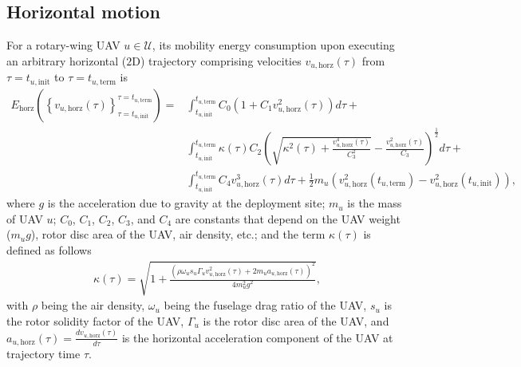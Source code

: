 \documentclass{article}
\begin{document}
\subsection{Horizontal motion}
For a rotary-wing UAV $u{\in}\mathcal{U}$, its mobility energy consumption upon executing an arbitrary horizontal ($2$D) trajectory comprising velocities $v_{u,\mathrm{horz}}(\tau)$ from $\tau{=}t_{u,\mathrm{init}}$ to $\tau{=}t_{u,\mathrm{term}}$ is
\begin{align}\label{Horizontal_energy}
    E_{\mathrm{horz}}\left(\left\{v_{u,\mathrm{horz}}(\tau)\right\}_{\tau{=}t_{u,\mathrm{init}}}^{\tau{=}t_{u,\mathrm{term}}}\right){=}&\int_{t_{u,\mathrm{init}}}^{t_{u,\mathrm{term}}}C_{0}\left(1{+}C_{1}v_{u,\mathrm{horz}}^{2}(\tau)\right)d\tau{+}\\&\int_{t_{u,\mathrm{init}}}^{t_{u,\mathrm{term}}}\kappa(\tau)C_{2}\left(\sqrt{\kappa^{2}(\tau){+}\frac{v_{u,\mathrm{horz}}^{4}(\tau)}{C_{3}^{2}}}{-}\frac{v_{u,\mathrm{horz}}^{2}(\tau)}{C_{3}}\right)^{\frac{1}{2}}d\tau{+}\nonumber\\&\int_{t_{u,\mathrm{init}}}^{t_{u,\mathrm{term}}}C_{4}v_{u,\mathrm{horz}}^{3}(\tau)d\tau{+}\frac{1}{2}m_{u}\left(v_{u,\mathrm{horz}}^{2}(t_{u,\mathrm{term}}){-}v_{u,\mathrm{horz}}^{2}(t_{u,\mathrm{init}})\right),\nonumber
\end{align}
where $g$ is the acceleration due to gravity at the deployment site; $m_{u}$ is the mass of UAV $u$; $C_{0}$, $C_{1}$, $C_{2}$, $C_{3}$, and $C_{4}$ are constants that depend on the UAV weight ($m_{u}g$), rotor disc area of the UAV, air density, etc.; and the term $\kappa(\tau)$ is defined as follows
\begin{align}\label{Kappa_term_horz}
    \kappa(\tau){=}\sqrt{1{+}\frac{\left(\rho\omega_{u}s_{u}\Gamma_{u}v_{u,\mathrm{horz}}^{2}(\tau){+}2m_{u}a_{u,\mathrm{horz}}(\tau)\right)^{2}}{4m_{u}^{2}g^{2}}},
\end{align}
with $\rho$ being the air density, $\omega_{u}$ being the fuselage drag ratio of the UAV, $s_{u}$ is the rotor solidity factor of the UAV, $\Gamma_{u}$ is the rotor disc area of the UAV, and $a_{u,\mathrm{horz}}(\tau){=}\frac{dv_{u,\mathrm{horz}}(\tau)}{d\tau}$ is the horizontal acceleration component of the UAV at trajectory time $\tau$.
\end{document}
